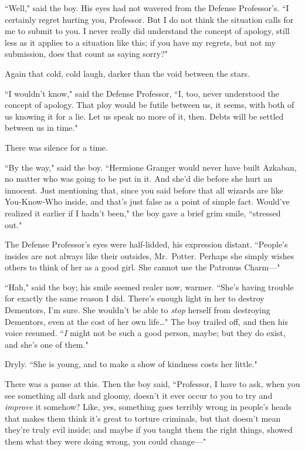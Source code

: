 ``Well," said the boy. His eyes had not wavered from the Defense Professor's. ``I certainly regret hurting you, Professor. But I do not think the situation calls for me to submit to you. I never really did understand the concept of apology, still less as it applies to a situation like this; if you have my regrets, but not my submission, does that count as saying sorry?"

Again that cold, cold laugh, darker than the void between the stars.

``I wouldn't know," said the Defense Professor, ``I, too, never understood the concept of apology. That ploy would be futile between us, it seems, with both of us knowing it for a lie. Let us speak no more of it, then. Debts will be settled between us in time."

There was silence for a time.

``By the way," said the boy. ``Hermione Granger would never have built Azkaban, no matter who was going to be put in it. And she'd die before she hurt an innocent. Just mentioning that, since you said before that all wizards are like You-Know-Who inside, and that's just false as a point of simple fact. Would've realized it earlier if I hadn't been," the boy gave a brief grim smile, ``stressed out."

The Defense Professor's eyes were half-lidded, his expression distant. ``People's insides are not always like their outsides, Mr.~Potter. Perhaps she simply wishes others to think of her as a good girl. She cannot use the Patronus Charm—"

``Hah," said the boy; his smile seemed realer now, warmer. ``She's having trouble for exactly the same reason I did. There's enough light in her to destroy Dementors, I'm sure. She wouldn't be able to \emph{stop} herself from destroying Dementors, even at the cost of her own life{\ldots}" The boy trailed off, and then his voice resumed. ``\emph{I} might not be such a good person, maybe; but they do exist, and she's one of them."

Dryly. ``She is young, and to make a show of kindness costs her little."

There was a pause at this. Then the boy said, ``Professor, I have to ask, when you see something all dark and gloomy, doesn't it ever occur to you to try and \emph{improve} it somehow? Like, yes, something goes terribly wrong in people's heads that makes them think it's great to torture criminals, but that doesn't mean they're truly evil inside; and maybe if you taught them the right things, showed them what they were doing wrong, you could change—"

